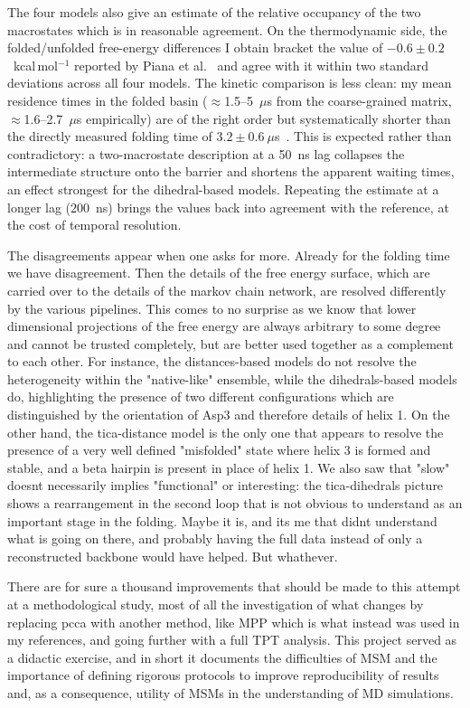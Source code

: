\documentclass[prl,twocolumn]{revtex4-1}
\begin{document}
The four models also give an estimate of the relative occupancy of the two macrostates which is in reasonable agreement.  On the thermodynamic side, the folded/unfolded free-energy
differences I obtain bracket the value of $-0.6 \pm 0.2$~kcal\,mol$^{-1}$
reported by Piana et al.~\cite{Piana2012} and agree with it within two
standard deviations across all four models. The kinetic comparison is
less clean: my mean residence times in the folded basin
($\approx$1.5--5~$\mu$s from the coarse-grained matrix, $\approx$1.6--2.7~$\mu$s
empirically) are of the right order but systematically shorter than the
directly measured folding time of $3.2 \pm 0.6~\mu$s~\cite{Piana2012}.
This is expected rather than contradictory: a two-macrostate description
at a 50~ns lag collapses the intermediate structure onto the barrier and
shortens the apparent waiting times, an effect strongest for the
dihedral-based models. Repeating the estimate at a longer lag ($200$~ns)
brings the values back into agreement with the reference, at the cost of
temporal resolution.

The disagreements appear  when one asks for more. Already for the folding time we have disagreement.
Then the details of the free energy surface, which are carried over to the details of the markov chain network, are resolved differently by the various pipelines. This comes to no surprise as we know that lower dimensional projections of the free energy are always arbitrary to some degree and cannot be trusted completely, but are better used together as a complement to each other. 
For instance, the distances-based models do not resolve the heterogeneity within the "native-like" ensemble, while the dihedrals-based models do, highlighting the presence of two different configurations which are distinguished by the orientation of Asp3 and therefore details of helix 1. 
On the other hand, the tica-distance model is the only one that appears to resolve the presence of a very well defined "misfolded" state where helix 3 is formed and stable, and a beta hairpin is present in place of helix 1.
We also saw that "slow" doesnt necessarily implies "functional" or interesting: the tica-dihedrals picture shows a rearrangement in the second loop that is not obvious to understand as an important stage in the folding. Maybe it is, and its me that didnt understand what is going on there, and probably having the full data instead of only a reconstructed backbone would have helped. But whathever.

There are for sure a thousand improvements that should be made to this attempt at a methodological study, most of all the investigation of what changes by replacing pcca with another method, like MPP which is what instead was used in my references, and going further with a full TPT analysis. This project served as a didactic exercise, and in short it documents the difficulties of MSM and the importance of defining rigorous protocols to improve reproducibility of results and, as a consequence, utility of MSMs in the understanding of MD simulations.
\end{document}
